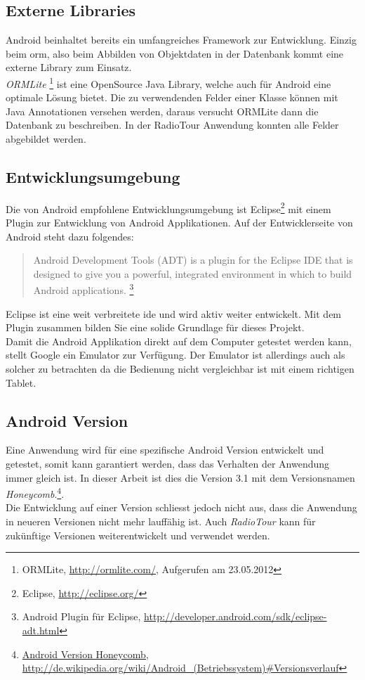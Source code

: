 \subsection{Externe Libraries}
Android beinhaltet bereits ein umfangreiches Framework zur Entwicklung. Einzig beim \gls{orm}, also beim Abbilden von Objektdaten in der Datenbank kommt eine externe Library zum Einsatz.
\\
\textit{ORMLite} \footnote{ORMLite, \url{http://ormlite.com/}, Aufgerufen am 23.05.2012} ist eine OpenSource Java Library, welche auch für Android eine optimale Lösung bietet. Die zu verwendenden Felder einer Klasse können mit Java Annotationen versehen werden, daraus versucht ORMLite dann die Datenbank zu beschreiben. In der RadioTour Anwendung konnten alle Felder abgebildet werden.


\subsection{Entwicklungsumgebung}
Die von Android empfohlene Entwicklungsumgebung ist Eclipse\footnote{Eclipse, \url{http://eclipse.org/}} mit einem Plugin zur Entwicklung von Android Applikationen. Auf der Entwicklerseite von Android steht dazu folgendes:
\begin{quote}
\grqq Android Development Tools (ADT) is a plugin for the Eclipse IDE that is designed to give you a powerful, integrated environment in which to build Android applications.\grqq
\footnote{Android Plugin für Eclipse, \url{http://developer.android.com/sdk/eclipse-adt.html}}
\end{quote}
Eclipse ist eine weit verbreitete \gls{ide} und wird aktiv weiter entwickelt. Mit dem Plugin zusammen bilden Sie eine solide Grundlage für dieses Projekt.
\\
Damit die Android Applikation direkt auf dem Computer getestet werden kann, stellt Google ein Emulator zur Verfügung. Der Emulator ist allerdings auch als solcher zu betrachten da die Bedienung nicht vergleichbar ist mit einem richtigen Tablet.

\subsection{Android Version}
Eine Anwendung wird für eine spezifische Android Version entwickelt und getestet, somit kann garantiert werden, dass das Verhalten der Anwendung  immer gleich ist. In dieser Arbeit ist dies die Version 3.1 mit dem Versionsnamen \textit{Honeycomb}.\footnote{\url{Android Version Honeycomb, http://de.wikipedia.org/wiki/Android_(Betriebssystem)\#Versionsverlauf}}.
\\
Die Entwicklung auf einer Version schliesst jedoch nicht aus, dass die Anwendung in neueren Versionen nicht mehr lauffähig ist. Auch \textit{RadioTour} kann für zukünftige Versionen weiterentwickelt und verwendet werden.


